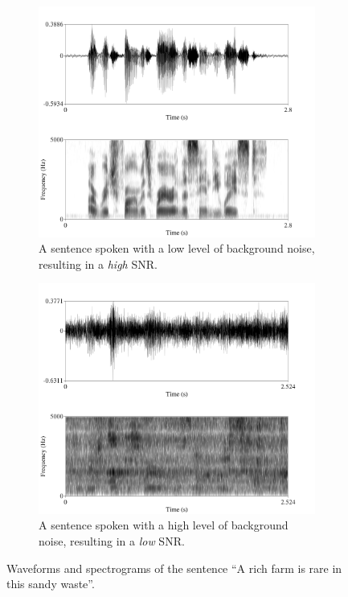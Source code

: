 \documentclass[dissertation,copyright]{uathesis}
\begin{document}
\begin{figure}[h!]
\centering
\begin{subfigure}{0.75\textwidth}
  \includegraphics[width=.9\textwidth]{figure/signal-SNR-intro-high.png}
  \caption{A sentence spoken with a low level of background noise, resulting in a \textit{high} SNR.}
  \label{fig:signal-SNR-intro-high}
\end{subfigure}
%
\begin{subfigure}{0.75\textwidth}
  \includegraphics[width=.9\textwidth]{figure/signal-SNR-intro-low.png}
  \caption{A sentence spoken with a high level of background noise, resulting in a \textit{low} SNR.}
  \label{fig:signal-SNR-intro-low}
\end{subfigure}
\caption{Waveforms and spectrograms of the sentence ``A rich farm is rare in this sandy waste''.}
\label{fig:signal-SNR-intro}
\end{figure}
\end{document}

